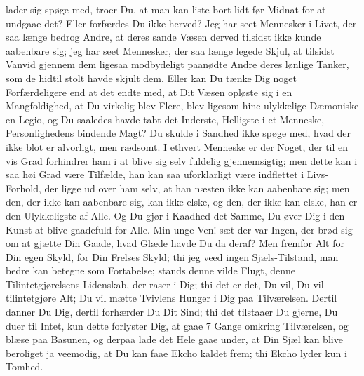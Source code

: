 \documentclass[12pt,a4paper]{article}
\begin{document}
lader sig spøge med, troer Du, at man kan liste bort lidt før Midnat for at undgaae det? Eller forfærdes Du ikke herved? Jeg har seet Mennesker i Livet, der saa længe bedrog Andre, at deres sande Væsen derved tilsidst ikke kunde aabenbare sig; jeg har seet Mennesker, der saa længe legede Skjul, at tilsidst Vanvid gjennem dem ligesaa modbydeligt paanødte Andre deres lønlige Tanker, som de hidtil stolt havde skjult dem. Eller kan Du tænke Dig noget Forfærdeligere end at det endte med, at Dit Væsen opløste sig i en Mangfoldighed, at Du virkelig blev Flere, blev ligesom hine ulykkelige Dæmoniske en Legio, og Du saaledes havde tabt det Inderste, Helligste i et Menneske, Personlighedens bindende Magt? Du skulde i Sandhed ikke spøge med, hvad der ikke blot er alvorligt, men rædsomt. I ethvert Menneske er der Noget, der til en vis Grad forhindrer ham i at blive sig selv fuldelig gjennemsigtig; men dette kan i saa høi Grad være Tilfælde, han kan saa uforklarligt være indflettet i Livs-Forhold, der ligge ud over ham selv, at han næsten ikke kan aabenbare sig; men den, der ikke kan aabenbare sig, kan ikke elske, og den, der ikke kan elske, han er den Ulykkeligste af Alle. Og Du gjør i Kaadhed det Samme, Du øver Dig i den Kunst at blive gaadefuld for Alle. Min unge Ven! sæt der var Ingen, der brød sig om at gjætte Din Gaade, hvad Glæde havde Du da deraf? Men fremfor Alt for Din egen Skyld, for Din Frelses Skyld; thi jeg veed ingen Sjæls-Tilstand, man bedre kan betegne som Fortabelse; stands denne vilde Flugt, denne Tilintetgjørelsens Lidenskab, der raser i Dig; thi det er det, Du vil, Du vil tilintetgjøre Alt; Du vil mætte Tvivlens Hunger i Dig paa Tilværelsen. Dertil danner Du Dig, dertil forhærder Du Dit Sind; thi det tilstaaer Du gjerne, Du duer til Intet, kun dette forlyster Dig, at gaae 7 Gange omkring Tilværelsen, og blæse paa Basunen, og derpaa lade det Hele gaae under, at Din Sjæl kan blive beroliget ja veemodig, at Du kan faae Ekcho kaldet frem; thi Ekcho lyder kun i Tomhed.
\end{document}
